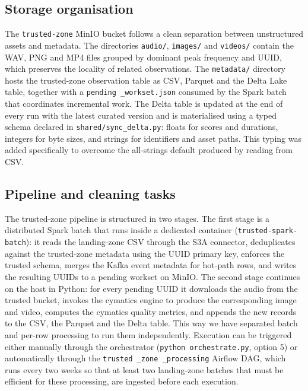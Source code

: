 \documentclass[11pt,a4paper]{article}
\begin{document}
\subsection{Storage organisation}
The \texttt{trusted-zone} MinIO bucket follows a clean separation between unstructured assets and metadata. The directories \texttt{audio/}, \texttt{images/} and \texttt{videos/} contain the WAV, PNG and MP4 files grouped by dominant peak frequency and UUID, which preserves the locality of related observations. The \texttt{metadata/} directory hosts the trusted-zone observation table as CSV, Parquet and the Delta Lake table, together with a \texttt{pending \_workset.json} consumed by the Spark batch that coordinates incremental work. The Delta table is updated at the end of every run with the latest curated version and is materialised using a typed schema declared in \texttt{shared/sync\_delta.py}: floats for scores and durations, integers for byte sizes, and strings for identifiers and asset paths. This typing was added specifically to overcome the all-strings default produced by reading from CSV.

\subsection{Pipeline and cleaning tasks}
The trusted-zone pipeline is structured in two stages. The first stage is a distributed Spark batch that runs inside a dedicated container (\texttt{trusted-spark-batch}): it reads the landing-zone CSV through the S3A connector, deduplicates against the trusted-zone metadata using the UUID primary key, enforces the trusted schema, merges the Kafka event metadata for hot-path rows, and writes the resulting UUIDs to a pending workset on MinIO. The second stage continues on the host in Python: for every pending UUID it downloads the audio from the trusted bucket, invokes the cymatics engine to produce the corresponding image and video, computes the cymatics quality metrics, and appends the new records to the CSV, the Parquet and the Delta table. This way we have separated batch and per-row processing to run them independently. Execution can be triggered either manually through the orchestrator (\texttt{python orchestrate.py}, option 5) or automatically through the \texttt{trusted \_zone \_processing} Airflow DAG, which runs every two weeks so that at least two landing-zone batches that must be efficient for these processing, are ingested before each execution.


\end{document}
